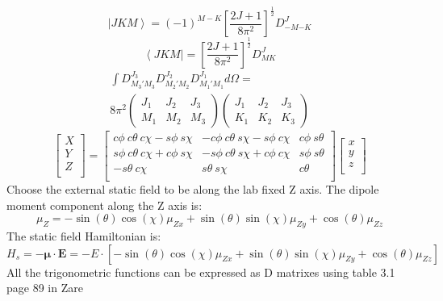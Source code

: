\documentclass{article}
\newcommand{\ket}[1]{\left |{#1}\right \rangle}
\newcommand{\bra}[1]{\left \langle {#1}\right |}
\newcommand{\D}[3]{D^{#1}_{{#2}{#3}}}%
\newcommand{\wigner}[6]{\begin{pmatrix}{#1}&{#2}&{#3}\\{#4}&{#5}&{#6}\end{pmatrix}}
\begin{document}
\begin{equation*}
\ket{JKM}=(-1)^{M-K}\left[\frac{2J+1}{8\pi^2}\right]^{\frac{1}{2}}\D{J}{-M}{-K}
\end{equation*}
\begin{equation*}
\bra{JKM}=\left[\frac{2J+1}{8\pi^2}\right]^{\frac{1}{2}}\D{J}{M}{K}
\end{equation*}
\begin{align*}
  \int\D{J_3}{M_3'}{M_3}\D{J_2}{M_2'}{M_2}\D{J_1}{M_1'}{M_1}d\Omega=\\8\pi^2 \wigner{J_1}{J_2}{J_3}{M_1}{M_2}{M_3}\wigner{J_1}{J_2}{J_3}{K_1}{K_2}{K_3}
\end{align*}
\begin{equation*}
  \begin{bmatrix}
    X\\
    Y\\
    Z\\
  \end{bmatrix}=
  \begin{bmatrix}
    c\phi~c\theta~c\chi-s\phi~s\chi &-c\phi~c\theta~s\chi-s\phi~c\chi & c\phi~s\theta\\
    s\phi~c\theta~c\chi+c\phi~s\chi &-s\phi~c\theta~s\chi+c\phi~c\chi & s\phi~s\theta\\ 
    -s\theta~c\chi & s\theta~s\chi & c\theta\\
  \end{bmatrix}
  \begin{bmatrix}
    x\\
    y\\
    z\\
  \end{bmatrix}
\end{equation*}
Choose the external static field to be along the lab fixed Z axis. The dipole moment component along the Z axis is:
\begin{equation*}
  \mu_Z=-\sin(\theta)\cos(\chi)\mu_{Zx}+\sin(\theta)\sin(\chi)\mu_{Zy}+\cos(\theta)\mu_{Zz}
\end{equation*}
The static field Hamiltonian is:
\begin{equation*}
  H_s=-\mathbf{\mu}\cdot\mathbf{E}=-E\cdot \left[-\sin(\theta)\cos(\chi)\mu_{Zx}+\sin(\theta)\sin(\chi)\mu_{Zy}+\cos(\theta)\mu_{Zz}\right]
\end{equation*}
All the trigonometric functions can be expressed as D matrixes using table 3.1 page 89 in Zare
\end{document}
